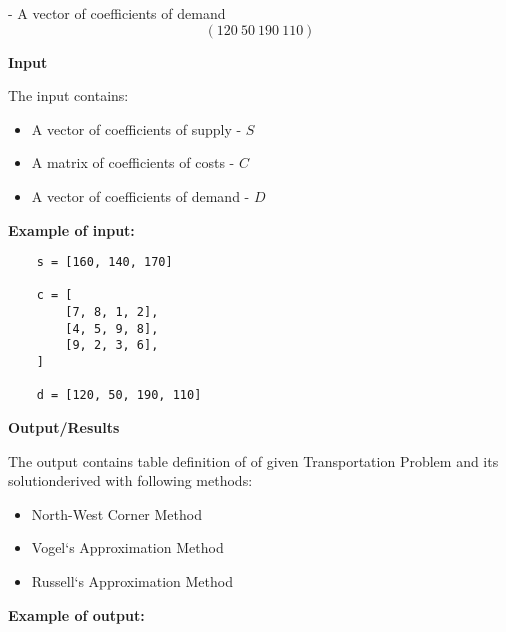\documentclass[12pt, legalpaper]{exam}
\begin{document}
- A vector of coefficients of demand 
$$ (120 \: 50 \: 190 \: 110) $$

\noindent     \textbf{Input}

\vspace{12pt}
The input contains:
\begin{itemize}
    \item A vector of coefficients of supply - $S$
    \item A matrix of coefficients of costs - $C$
    \item A vector of coefficients of demand - $D$
\end{itemize}

\vspace{12pt}
\textbf{Example of input:}
\begin{verbatim}
    s = [160, 140, 170]

    c = [
        [7, 8, 1, 2],
        [4, 5, 9, 8],
        [9, 2, 3, 6],
    ]

    d = [120, 50, 190, 110]
\end{verbatim}

\vspace{12pt}
\noindent     \textbf{Output/Results}

The output contains table definition of of given Transportation Problem
and its solutionderived with following methods:

\begin{itemize}
    \item North-West Corner Method
    \item Vogel`s Approximation Method
    \item Russell`s Approximation Method
\end{itemize}

\vspace{12pt}
\textbf{Example of output:}
\end{document}

